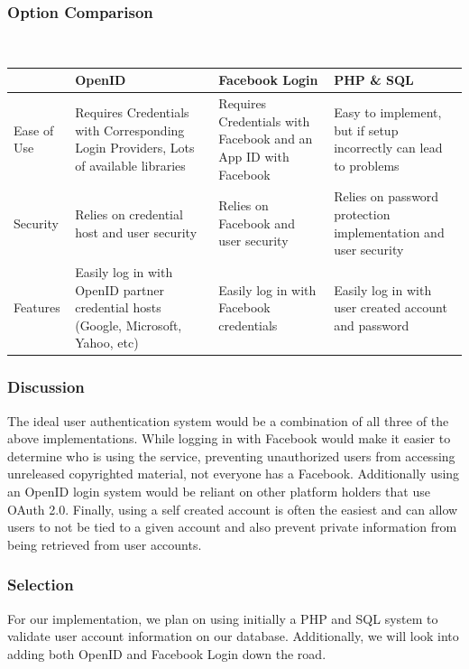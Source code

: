 \documentclass[onecolumn, draftclsnofoot,10pt, compsoc]{IEEEtran}
\begin{document}
{\newpage
\subsubsection{Option Comparison} ~\\

\tablehead{}
\begin{supertabular}{|p{2.5cm}|p{4.5cm}|p{4.5cm}|p{4.5cm}|}
\hline
	& OpenID
	& Facebook Login
	& PHP \& SQL\\
\hline
	Ease of Use
	& Requires Credentials with Corresponding Login Providers, Lots of available libraries
	& Requires Credentials with Facebook and an App ID with Facebook
	& Easy to implement, but if setup incorrectly can lead to problems\\
\hline
	Security
	& Relies on credential host and user security
	& Relies on Facebook and user security
	& Relies on password protection implementation and user security\\
\hline
	Features
	& Easily log in with OpenID partner credential hosts (Google, Microsoft, Yahoo, etc)
	& Easily log in with Facebook credentials
	& Easily log in with user created account and password \\
\hline

\end{supertabular}

\medskip

\subsubsection{Discussion}
\noindent The ideal user authentication system would be a combination of all three of the above implementations. While logging in with Facebook would make it easier to determine who is using the service, preventing unauthorized users from accessing unreleased copyrighted material, not everyone has a Facebook. Additionally using an OpenID login system would be reliant on other platform holders that use OAuth 2.0. Finally, using a self created account is often the easiest and can allow users to not be tied to a given account and also prevent private information from being retrieved from user accounts.

\medskip
\subsubsection{Selection}
\noindent For our implementation, we plan on using initially a PHP and SQL system to validate user account information on our database. Additionally, we will look into adding both OpenID and Facebook Login down the road.







}
\end{document}
